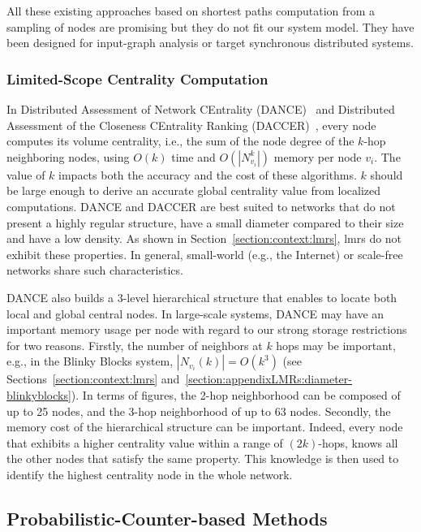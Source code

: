 All these existing approaches based on shortest paths computation from a sampling of nodes are promising but they do not fit our system model. They have been designed for input-graph analysis or target synchronous distributed systems.

\subsubsection{Limited-Scope Centrality Computation}

In Distributed Assessment of Network CEntrality (DANCE)~\cite{wehmuth2011distributed} and Distributed Assessment of the Closeness CEntrality Ranking (DACCER)~\cite{wehmuth2013daccer}, every node computes its volume centrality, i.e., the sum of the node degree of the $k$-hop neighboring nodes, using $O(k)$ time and $O(|N_{v_i}^k|)$ memory per node $v_i$. The value of $k$ impacts both the accuracy and the cost of these algorithms. $k$ should be large enough to derive an accurate global centrality value from localized computations. DANCE and DACCER are best suited to networks that do not present a highly regular structure, have a small diameter compared to their size and have a low density. As shown in Section~\ref{section:context:lmrs}, \gls{lmrs} do not exhibit these properties. In general, small-world (e.g., the Internet) or scale-free networks share such characteristics.

DANCE also builds a 3-level hierarchical structure that enables to locate both local and global central nodes. In large-scale systems, DANCE may have an important memory usage per node with regard to our strong storage restrictions for two reasons. Firstly, the number of neighbors at $k$ hops may be important, e.g., in the Blinky Blocks system, $|N_{v_i}(k)| = O(k^3)$ (see Sections~\ref{section:context:lmrs} and~\ref{section:appendixLMRs:diameter-blinkyblocks}). In terms of figures, the 2-hop neighborhood can be composed of up to 25 nodes, and the 3-hop neighborhood of up to 63 nodes. Secondly, the memory cost of the hierarchical structure can be important. Indeed, every node that exhibits a higher centrality value within a range of $(2k)$-hops, knows all the other nodes that satisfy the same property. This knowledge is then used to identify the highest centrality node in the whole network.

\subsection{Probabilistic-Counter-based Methods}

